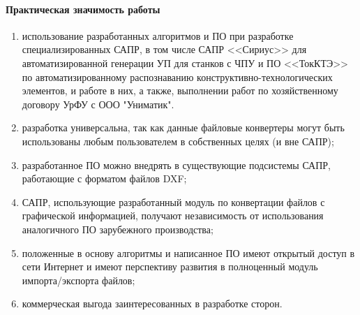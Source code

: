\paragraph{Практическая значимость работы}

\begin{enumerate}
	\item использование разработанных алгоритмов и ПО при разработке специализированных САПР, в том числе САПР <<Сириус>> для автоматизированной генерации УП для станков с ЧПУ и ПО <<ТокКТЭ>> по автоматизированному распознаванию конструктивно-технологических элементов, и работе в них, а также, выполнении работ по хозяйственному договору УрФУ с ООО "Униматик".
	\item разработка универсальна, так как данные файловые конвертеры могут быть использованы любым пользователем в собственных целях (и вне САПР);
	\item разработанное ПО можно внедрять в существующие подсистемы САПР, работающие с форматом файлов DXF;
	\item САПР, использующие разработанный модуль по конвертации файлов с графической информацией, получают независимость от использования аналогичного ПО зарубежного производства;
	\item положенные в основу алгоритмы и написанное ПО имеют открытый доступ в сети Интернет и имеют перспективу развития в полноценный модуль импорта/экспорта файлов;
	\item коммерческая выгода заинтересованных в разработке сторон.
\end{enumerate}